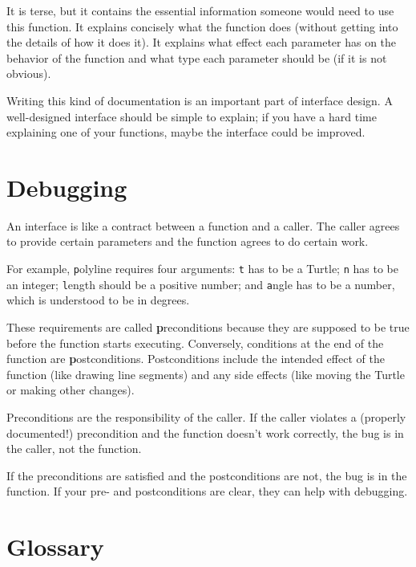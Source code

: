 \documentclass[
DIV=11,
fontsize=12,
twoside,
headinclude=false,
titlepage=firstiscover,
abstract=true,
headsepline=true,
footsepline=true,
chapterprefix=true, %
headings=big,
bibliography=totoc,%
captions=tableheading
]{scrbook}
\theoremstyle{definition}
\begin{document}
It is terse, but it contains the essential information
someone would need to use this function.  It explains concisely what
the function does (without getting into the details of how it does
it).  It explains what effect each parameter has on the behavior of
the function and what type each parameter should be (if it is not
obvious).

Writing this kind of documentation is an important part of interface
design.  A well-designed interface should be simple to explain;
if you have a hard time explaining one of your functions,
maybe the interface could be improved.


\section{Debugging}

An interface is like a contract between a function and a caller.
The caller agrees to provide certain parameters and the function
agrees to do certain work.

For example, {\texttt polyline} requires four arguments: {\texttt t} has to be
a Turtle; {\texttt n} has to be an
integer; {\texttt length} should be a positive number; and {\texttt
  angle} has to be a number, which is understood to be in degrees.

These requirements are called {\textbf preconditions} because they
are supposed to be true before the function starts executing.
Conversely, conditions at the end of the function are
{\textbf postconditions}.  Postconditions include the intended
effect of the function (like drawing line segments) and any
side effects (like moving the Turtle or making other changes).

Preconditions are the responsibility of the caller.  If the caller
violates a (properly documented!) precondition and the function
doesn't work correctly, the bug is in the caller, not the function.

If the preconditions are satisfied and the postconditions are
not, the bug is in the function.  If your pre- and postconditions
are clear, they can help with debugging.


\section{Glossary}
\end{document}
